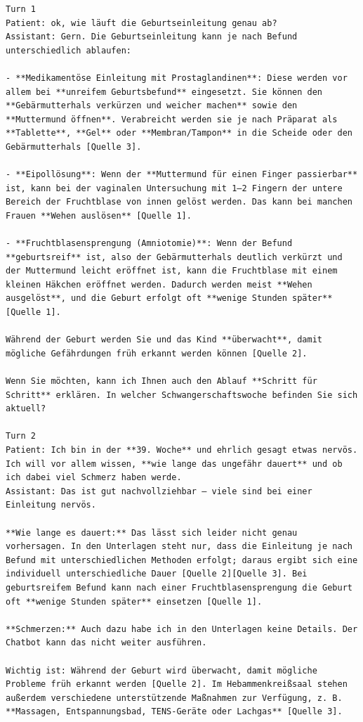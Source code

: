 \begin{Verbatim}[fontsize=\small,breaklines=true,breakanywhere=true]
Turn 1
Patient: ok, wie läuft die Geburtseinleitung genau ab?
Assistant: Gern. Die Geburtseinleitung kann je nach Befund unterschiedlich ablaufen:

- **Medikamentöse Einleitung mit Prostaglandinen**: Diese werden vor allem bei **unreifem Geburtsbefund** eingesetzt. Sie können den **Gebärmutterhals verkürzen und weicher machen** sowie den **Muttermund öffnen**. Verabreicht werden sie je nach Präparat als **Tablette**, **Gel** oder **Membran/Tampon** in die Scheide oder den Gebärmutterhals [Quelle 3].

- **Eipollösung**: Wenn der **Muttermund für einen Finger passierbar** ist, kann bei der vaginalen Untersuchung mit 1–2 Fingern der untere Bereich der Fruchtblase von innen gelöst werden. Das kann bei manchen Frauen **Wehen auslösen** [Quelle 1].

- **Fruchtblasensprengung (Amniotomie)**: Wenn der Befund **geburtsreif** ist, also der Gebärmutterhals deutlich verkürzt und der Muttermund leicht eröffnet ist, kann die Fruchtblase mit einem kleinen Häkchen eröffnet werden. Dadurch werden meist **Wehen ausgelöst**, und die Geburt erfolgt oft **wenige Stunden später** [Quelle 1].

Während der Geburt werden Sie und das Kind **überwacht**, damit mögliche Gefährdungen früh erkannt werden können [Quelle 2].

Wenn Sie möchten, kann ich Ihnen auch den Ablauf **Schritt für Schritt** erklären. In welcher Schwangerschaftswoche befinden Sie sich aktuell?

Turn 2
Patient: Ich bin in der **39. Woche** und ehrlich gesagt etwas nervös. Ich will vor allem wissen, **wie lange das ungefähr dauert** und ob ich dabei viel Schmerz haben werde.
Assistant: Das ist gut nachvollziehbar — viele sind bei einer Einleitung nervös.

**Wie lange es dauert:** Das lässt sich leider nicht genau vorhersagen. In den Unterlagen steht nur, dass die Einleitung je nach Befund mit unterschiedlichen Methoden erfolgt; daraus ergibt sich eine individuell unterschiedliche Dauer [Quelle 2][Quelle 3]. Bei geburtsreifem Befund kann nach einer Fruchtblasensprengung die Geburt oft **wenige Stunden später** einsetzen [Quelle 1].

**Schmerzen:** Auch dazu habe ich in den Unterlagen keine Details. Der Chatbot kann das nicht weiter ausführen.

Wichtig ist: Während der Geburt wird überwacht, damit mögliche Probleme früh erkannt werden [Quelle 2]. Im Hebammenkreißsaal stehen außerdem verschiedene unterstützende Maßnahmen zur Verfügung, z. B. **Massagen, Entspannungsbad, TENS-Geräte oder Lachgas** [Quelle 3].


\end{Verbatim}
